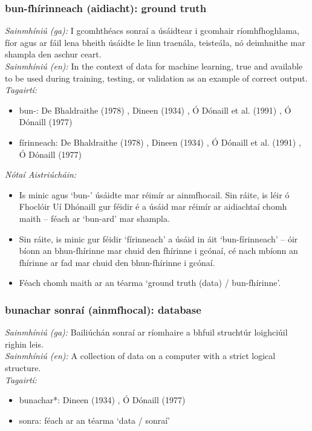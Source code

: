 \subsubsection*{bun-fhírinneach (aidiacht): ground truth}
 \noindent \textit{Sainmhíniú (ga):} I gcomhthéacs sonraí a úsáidtear i gcomhair ríomhfhoghlama, fíor agus ar fáil lena bheith úsáidte le linn traenála, teisteála, nó deimhnithe mar shampla den aschur ceart.
\\
 \noindent \textit{Sainmhíniú (en):} In the context of data for machine learning, true and available to be used during training, testing, or validation as an example of correct output.
\\
 \noindent \textit{Tagairtí:}
\begin{itemize}
	\item bun-: De Bhaldraithe (1978) \cite{de-bhaldraithe}, Dineen (1934) \cite{dineen}, Ó Dónaill et al. (1991) \cite{focloir-beag}, Ó Dónaill (1977) \cite{odonaill}
	\item fírinneach: De Bhaldraithe (1978) \cite{de-bhaldraithe}, Dineen (1934) \cite{dineen}, Ó Dónaill et al. (1991) \cite{focloir-beag}, Ó Dónaill (1977) \cite{odonaill}
\end{itemize}

 \noindent \textit{Nótaí Aistriúcháin:}
\begin{itemize}
	\item Is minic agus `bun-' úsáidte mar réimír ar ainmfhocail. Sin ráite, is léir ó Fhoclóir Uí Dhónaill gur féidir é a úsáid mar réimír ar aidiachtaí chomh maith -- féach ar `bun-ard' mar shampla.
	\item Sin ráite, is minic gur féidir `fírinneach' a úsáid in áit `bun-fírinneach' -- óir bíonn an bhun-fhírinne mar chuid den fhírinne i gcónaí, cé nach mbíonn an fhírinne ar fad mar chuid den bhun-fhírinne i gcónaí.
	\item Féach chomh maith ar an téarma `ground truth (data) / bun-fhírinne'.
\end{itemize}


\subsubsection*{bunachar sonraí (ainmfhocal): database}
 \noindent \textit{Sainmhíniú (ga):} Bailiúchán sonraí ar ríomhaire a bhfuil struchtúr loighciúil righin leis.
\\
 \noindent \textit{Sainmhíniú (en):} A collection of data on a computer with a strict logical structure.
\\
 \noindent \textit{Tagairtí:}
\begin{itemize}
	\item bunachar*: Dineen (1934) \cite{dineen}, Ó Dónaill (1977) \cite{odonaill}
	\item sonra: féach ar an téarma `data / sonraí'
\end{itemize}

